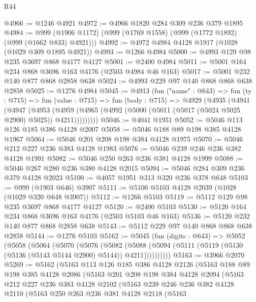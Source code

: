\begin{lexlean}{R44}
\begin{coremodule}
@4966 := @1246 @4921
@4972 := @4966 @1820 @284 @309 @236 @379 @1895
@4984 := @999 (@1906 @1172) (@999 (@1769 @1558) (@999 (@1772 @1892) (@999 (@1662 @833) @4921)))
@4992 := @4972 @4984 @4128 @1917 (@1028 (@1029 @309 @1895 @4921))
@4993 := @1266 @4984
@5000 := @4993 @129 @98 @235 @3697 @868 @4177 @4127
@5001 := @2400 @4984
@5011 := @5001 @164 @234 @868 @3696 @163 @4176 (@2503 @4984 @46 @163)
@5017 := @5001 @232 @140 @877 @868 @2858 @638
@5024 := @4993 @229 @97 @140 @868 @868 @638 @2858
@5025 := @1276 @4984
@5045 := @4913
    (fun ("name" : @643) =>
    fun (ty : @715) =>
    fun (value : @715) =>
    fun (body : @715) =>
    @4929
      (@4935
        (@4941
          (@4947
            (@4953
              (@4959 (@4965 (@4992 (@5000 (@5011 (@5017 (@5024 @5025 @2900) @5025)) @4211)))))))))
@5046 := @4041 @1951
@5052 := @5046 @113 @126 @185 @386 @4128 @2007
@5058 := @5046 @188 @89 @198 @385 @4128 @1967
@5064 := @5046 @201 @208 @198 @384 @4128 @1975
@5070 := @5046 @212 @227 @236 @383 @4128 @1983
@5076 := @5046 @239 @246 @236 @382 @4128 @1991
@5082 := @5046 @250 @263 @236 @381 @4128 @1999
@5088 := @5046 @267 @280 @236 @380 @4128 @2015
@5094 := @5046 @284 @309 @236 @379 @4128 @2023
@5100 := @4057 @1951 @313 @320 @236 @378 @648
@5103 := @999 (@1903 @646) @3907
@5111 := @5100 @5103 @4128 @2039 (@1028 (@1029 @320 @648 @3907))
@5112 := @1266 @5103
@5119 := @5112 @129 @98 @235 @3697 @868 @4177 @4127
@5120 := @2400 @5103
@5130 := @5120 @164 @234 @868 @3696 @163 @4176 (@2503 @5103 @46 @163)
@5136 := @5120 @232 @140 @877 @868 @2858 @638
@5143 := @5112 @229 @97 @140 @868 @868 @638 @2858
@5144 := @1276 @5103
@5162 := @5045
    (fun (digits : @643) =>
    @5052
      (@5058
        (@5064
          (@5070
            (@5076
              (@5082
                (@5088
                  (@5094 (@5111 (@5119 (@5130 (@5136 (@5143 @5144 @2900) @5144)) @4211))))))))))
@5163 := @3966 @2070
@5269 := @5162
    (@5163
      @113
      @126
      @185
      @386
      @4128
      @2126
      (@5163
        @188
        @89
        @198
        @385
        @4128
        @2086
        (@5163
          @201
          @208
          @198
          @384
          @4128
          @2094
          (@5163
            @212
            @227
            @236
            @383
            @4128
            @2102
            (@5163
              @239
              @246
              @236
              @382
              @4128
              @2110
              (@5163
                @250
                @263
                @236
                @381
                @4128
                @2118
                (@5163

\end{coremodule}
\end{lexlean}
